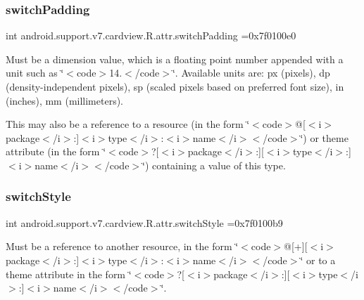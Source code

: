 \subsubsection{\texorpdfstring{switch\+Padding}{switchPadding}}
{\footnotesize\ttfamily int android.\+support.\+v7.\+cardview.\+R.\+attr.\+switch\+Padding =0x7f0100e0\hspace{0.3cm}{\ttfamily [static]}}

Must be a dimension value, which is a floating point number appended with a unit such as \char`\"{}$<$code$>$14.\+5sp$<$/code$>$\char`\"{}. Available units are\+: px (pixels), dp (density-\/independent pixels), sp (scaled pixels based on preferred font size), in (inches), mm (millimeters). 

This may also be a reference to a resource (in the form \char`\"{}$<$code$>$@\mbox{[}$<$i$>$package$<$/i$>$\+:\mbox{]}$<$i$>$type$<$/i$>$\+:$<$i$>$name$<$/i$>$$<$/code$>$\char`\"{}) or theme attribute (in the form \char`\"{}$<$code$>$?\mbox{[}$<$i$>$package$<$/i$>$\+:\mbox{]}\mbox{[}$<$i$>$type$<$/i$>$\+:\mbox{]}$<$i$>$name$<$/i$>$$<$/code$>$\char`\"{}) containing a value of this type. \mbox{\label{classandroid_1_1support_1_1v7_1_1cardview_1_1R_1_1attr_aad5de7139ec7a0aaa9b3ff7a957f370e}} 
\subsubsection{\texorpdfstring{switch\+Style}{switchStyle}}
{\footnotesize\ttfamily int android.\+support.\+v7.\+cardview.\+R.\+attr.\+switch\+Style =0x7f0100b9\hspace{0.3cm}{\ttfamily [static]}}

Must be a reference to another resource, in the form \char`\"{}$<$code$>$@\mbox{[}+\mbox{]}\mbox{[}$<$i$>$package$<$/i$>$\+:\mbox{]}$<$i$>$type$<$/i$>$\+:$<$i$>$name$<$/i$>$$<$/code$>$\char`\"{} or to a theme attribute in the form \char`\"{}$<$code$>$?\mbox{[}$<$i$>$package$<$/i$>$\+:\mbox{]}\mbox{[}$<$i$>$type$<$/i$>$\+:\mbox{]}$<$i$>$name$<$/i$>$$<$/code$>$\char`\"{}. \mbox{\label{classandroid_1_1support_1_1v7_1_1cardview_1_1R_1_1attr_a98c4d99255d0d40a6124ad8dbac74bf1}} 
